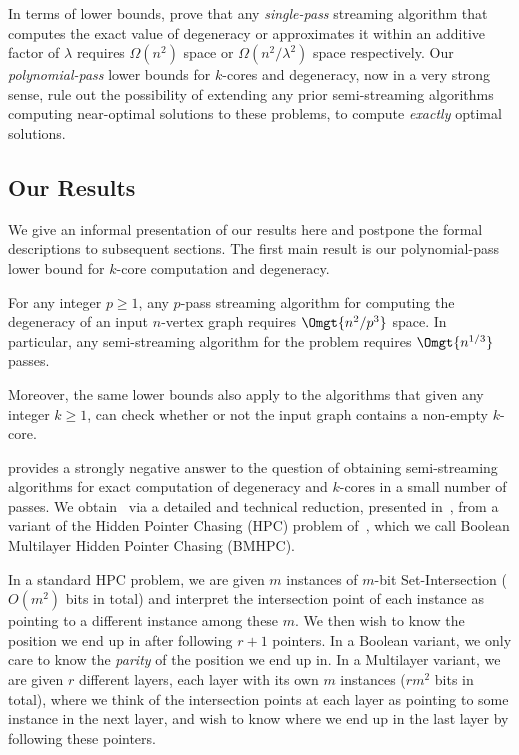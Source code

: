 \medskip

In terms of lower bounds, \cite{BeraCG19} prove that any \emph{single-pass} streaming algorithm that computes the exact value of degeneracy or approximates it within an additive factor of $\lambda$ requires $\Omega(n^2)$ space or $\Omega(n^2/\lambda^2)$ space respectively. Our \emph{polynomial-pass} lower bounds for $k$-cores and degeneracy, now in a very strong sense, rule out the possibility of extending any prior semi-streaming algorithms computing near-optimal solutions to these problems, to compute \emph{exactly} optimal solutions. 

\subsection{Our Results}\label{sec:res}

We give an informal presentation of our results here and postpone the formal descriptions to subsequent sections. The first main result is 
our polynomial-pass lower bound for $k$-core computation and degeneracy. 
\\

\begin{result}\label{res:stream-lb}
	For any integer $p \geq 1$, any $p$-pass streaming algorithm for computing the degeneracy of an input $n$-vertex graph requires $\Omgt{n^2/p^3}$ space. In particular, any semi-streaming algorithm for the problem requires $\Omgt{n^{1/3}}$ passes. 

\noindent	
	Moreover, the same lower bounds also apply 
	to the algorithms that given any integer $k \geq 1$, can check whether or not the input graph contains a non-empty $k$-core. 
\end{result}

 provides a strongly negative answer to the question of obtaining semi-streaming algorithms for exact computation of degeneracy and $k$-cores in a small number of passes. 
We obtain~ via a detailed and technical reduction, presented in~, from a variant of the Hidden Pointer Chasing (HPC) problem of~\cite{AssadiCK19}, which we call Boolean Multilayer Hidden Pointer Chasing (BMHPC). 

In a standard HPC problem, we are given $m$ instances of $m$-bit Set-Intersection ($O(m^2)$ bits in total) and interpret the intersection point of each instance as pointing to a different instance among these $m$. We then wish to know the position we end up in after following $r+1$ pointers. In a Boolean variant, we only care to know the \textit{parity} of the position we end up in. In a Multilayer variant, we are given $r$ different layers, each layer with its own $m$ instances ($r m^2$ bits in total), where we think of the intersection points at each layer as pointing to some instance in the next layer, and wish to know where we end up in the last layer by following these pointers.

